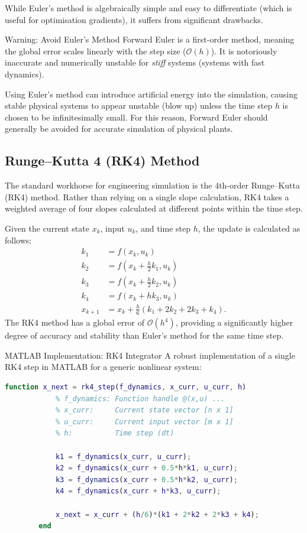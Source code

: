 While Euler's method is algebraically simple and easy to differentiate (which is useful for optimisation gradients), it suffers from significant drawbacks.

\begin{alertbox}{Warning: Avoid Euler's Method}
	Forward Euler is a first-order method, meaning the global error scales linearly with the step size ($\mathcal{O}(h)$). It is notoriously inaccurate and numerically unstable for \emph{stiff} systems (systems with fast dynamics). 
	
	Using Euler's method can introduce artificial energy into the simulation, causing stable physical systems to appear unstable (blow up) unless the time step $h$ is chosen to be infinitesimally small. {For this reason, Forward Euler should generally be avoided for accurate simulation of physical plants.}
\end{alertbox}

\subsection{Runge--Kutta 4 (RK4) Method}
The standard workhorse for engineering simulation is the 4th-order Runge--Kutta (RK4) method. Rather than relying on a single slope calculation, RK4 takes a weighted average of four slopes calculated at different points within the time step.

Given the current state $x_k$, input $u_k$, and time step $h$, the update is calculated as follows:
\begin{align*}
	k_1 &= f(x_k, u_k) \nonumber \\
	k_2 &= f\left(x_k + \frac{h}{2} k_1, u_k\right) \nonumber \\
	k_3 &= f\left(x_k + \frac{h}{2} k_2, u_k\right) \nonumber \\
	k_4 &= f(x_k + h k_3, u_k) \nonumber \\
	x_{k+1} &= x_k + \frac{h}{6} (k_1 + 2k_2 + 2k_3 + k_4).
\end{align*}
The RK4 method has a global error of $\mathcal{O}(h^4)$, providing a significantly higher degree of accuracy and stability than Euler's method for the same time step.

\begin{examplebox}{MATLAB Implementation: RK4 Integrator}
	A robust implementation of a single RK4 step in MATLAB for a generic nonlinear system:
	
	\begin{lstlisting}[language=Matlab]
		function x_next = rk4_step(f_dynamics, x_curr, u_curr, h)
			% f_dynamics: Function handle @(x,u) ...
			% x_curr:     Current state vector [n x 1]
			% u_curr:     Current input vector [m x 1]
			% h:          Time step (dt)
		
			k1 = f_dynamics(x_curr, u_curr);
			k2 = f_dynamics(x_curr + 0.5*h*k1, u_curr);
			k3 = f_dynamics(x_curr + 0.5*h*k2, u_curr);
			k4 = f_dynamics(x_curr + h*k3, u_curr);
		
			x_next = x_curr + (h/6)*(k1 + 2*k2 + 2*k3 + k4);
		end
	\end{lstlisting}
\end{examplebox}

